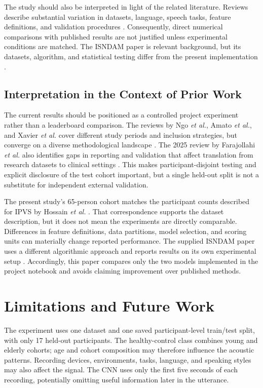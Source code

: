 \documentclass[11pt,a4paper]{article}
\begin{document}
The study should also be interpreted in light of the related literature. Reviews describe substantial variation in datasets, language, speech tasks, feature definitions, and validation procedures \cite{ngo2022,amato2023,xavier2025,farajollahi2025}. Consequently, direct numerical comparisons with published results are not justified unless experimental conditions are matched. The ISNDAM paper is relevant background, but its datasets, algorithm, and statistical testing differ from the present implementation \cite{luna2023}.


\subsection{Interpretation in the Context of Prior Work}
The current results should be positioned as a controlled project experiment rather than a leaderboard comparison. The reviews by Ngo \emph{et al.}, Amato \emph{et al.}, and Xavier \emph{et al.} cover different study periods and inclusion strategies, but converge on a diverse methodological landscape \cite{ngo2022,amato2023,xavier2025}. The 2025 review by Farajollahi \emph{et al.} also identifies gaps in reporting and validation that affect translation from research datasets to clinical settings \cite{farajollahi2025}. This makes participant-disjoint testing and explicit disclosure of the test cohort important, but a single held-out split is not a substitute for independent external validation.

The present study's 65-person cohort matches the participant counts described for IPVS by Hossain \emph{et al.} \cite{hossain2026}. That correspondence supports the dataset description, but it does not mean the experiments are directly comparable. Differences in feature definitions, data partitions, model selection, and scoring units can materially change reported performance. The supplied ISNDAM paper uses a different algorithmic approach and reports results on its own experimental setup \cite{luna2023}. Accordingly, this paper compares only the two models implemented in the project notebook and avoids claiming improvement over published methods.

\section{Limitations and Future Work}
The experiment uses one dataset and one saved participant-level train/test split, with only 17 held-out participants. The healthy-control class combines young and elderly cohorts; age and cohort composition may therefore influence the acoustic patterns. Recording devices, environments, tasks, language, and speaking styles may also affect the signal. The CNN uses only the first five seconds of each recording, potentially omitting useful information later in the utterance.
\end{document}
